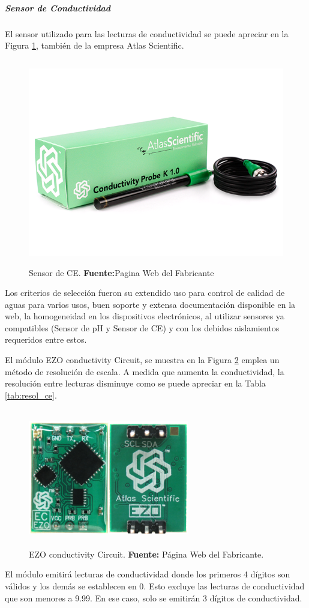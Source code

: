 \subparagraph{Sensor de Conductividad}
El sensor utilizado para las lecturas de conductividad se puede apreciar en la Figura \ref{fig:4.12}, también de la empresa Atlas Scientific.
\begin{figure}[ht]
\centering
	\includegraphics[width=150mm, height=90mm]{Imagenes/2021/imag24.png}%
	\caption[Sensor de CE]{Sensor de CE.  \textbf{Fuente:}Pagina Web del Fabricante \cite{atlasce}}
	\label{fig:4.12}
\end{figure}
Los criterios de selección fueron su extendido uso para control de calidad de aguas para varios usos, buen soporte y extensa documentación disponible en la web, la homogeneidad en los dispositivos electrónicos, al utilizar sensores ya compatibles (Sensor de pH y Sensor de CE) y con los debidos aislamientos requeridos entre estos.  
 
El módulo EZO conductivity Circuit, se muestra en la Figura \ref{fig:4.13} emplea un método de resolución de escala. A medida que aumenta la conductividad, la resolución entre lecturas disminuye como se puede apreciar en la Tabla \ref{tab:resol_ce}.
\begin{figure}[ht]
    \centering
    \includegraphics[width=70mm, height=60mm]{Imagenes/2021/imag28.png}
    \caption[EZO conductivity Circuit]{EZO conductivity Circuit. \textbf{Fuente: }Página Web del Fabricante.}
    \label{fig:4.13}
\end{figure}
El módulo emitirá lecturas de conductividad donde los primeros 4 dígitos son válidos y los demás se establecen en 0. Esto excluye las lecturas de conductividad que son menores a 9.99. En ese caso, solo se emitirán 3 dígitos de conductividad.

